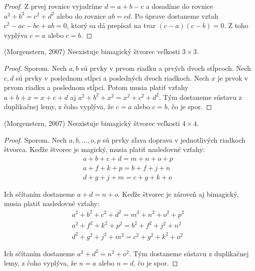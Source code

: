 \begin{proof} Z prvej rovnice vyjadríme $d = a + b - c$ a dosadíme do rovnice $a^2 + b^2 = c^2 + d^2$ alebo do rovnice $ab = cd$. Po úprave dostaneme vzťah $c^2 - ac - bc + ab = 0$, ktorý sa dá prepísať na tvar $(c - a)(c - b) = 0$. Z toho vyplýva $c = a$ alebo $c = b$.
\end{proof} 

\begin{theorem} (Morgenstern, 2007) Neexistuje bimagický štvorec veľkosti $3 \times 3$.
\end{theorem}

\begin{proof} Sporom. Nech $a,b$ sú prvky v prvom riadku a prvých dvoch stĺpcoch. Nech $c,d$ sú prvky v poslednom stĺpci a posledných dvoch riadkoch. Nech $x$ je prvok v prvom riadku a poslednom stĺpci. Potom musia platiť vzťahy $a + b + x = x + c + d$ aj $a^2 + b^2 + x^2 = x^2 + c^2 + d^2$. Tým dostaneme sústavu z duplikačnej lemy, z čoho vyplýva, že $c = a$ alebo $c = b$, čo je spor.
\end{proof} 

\begin{theorem} (Morgenstern, 2007) Neexistuje bimagický štvorec veľkosti $4 \times 4$.
\end{theorem}

\begin{proof} Sporom. Nech $a, b, \dots , o, p$ sú prvky zľava doprava v jednotlivých riadkoch štvorca. Keďže štvorec je magický, musia platiť nasledovné vzťahy:
\begin{gather*}
a + b + c + d = m + n + o + p \\
a + f + k + p = b + f + j + n \\
d + g + j + m = c + g + k + o
\end{gather*}

Ich sčítaním dostaneme $a + d = n + o$. Keďže štvorec je zároveň aj bimagický, musia platiť nasledovné vzťahy:
\begin{gather*}
a^2 + b^2 + c^2 + d^2 = m^2 + n^2 + o^2 + p^2 \\
a^2 + f^2 + k^2 + p^2 = b^2 + f^2 + j^2 + n^2 \\
d^2 + g^2 + j^2 + m^2 = c^2 + g^2 + k^2 + o^2
\end{gather*}

Ich sčítaním dostaneme $a^2 + d^2 = n^2 + o^2$. Tým dostaneme sústavu z duplikačnej lemy, z čoho vyplýva, že $n = a$ alebo $n = d$, čo je spor.
\end{proof} 


